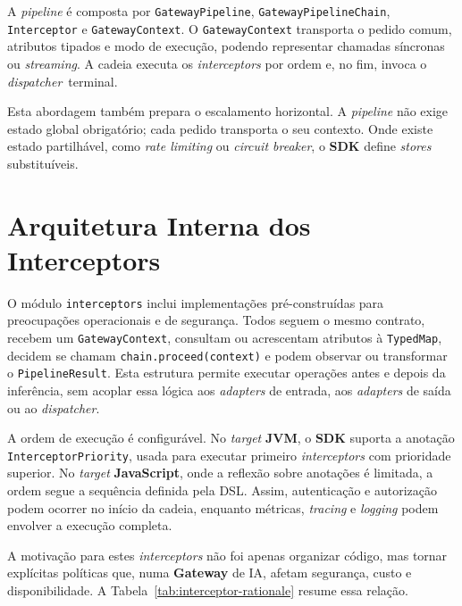     A \textit{pipeline} é composta por \texttt{GatewayPipeline}, \texttt{Gateway\-Pipeline\-Chain}, \texttt{Interceptor} e \texttt{Gateway\allowbreak Context}. O \texttt{GatewayContext} transporta o pedido comum, atributos tipados e modo de execução, podendo representar chamadas síncronas ou \textit{streaming}. A cadeia executa os \textit{interceptors} por ordem e, no fim, invoca o \textit{dispatcher}\allowbreak~terminal.

    Esta abordagem também prepara o escalamento horizontal. A \textit{pipeline} não exige estado global obrigatório; cada pedido transporta o seu contexto. Onde existe estado partilhável, como \textit{rate limiting} ou \textit{circuit breaker}, o \textbf{SDK} define \textit{stores} substituíveis. 

    \section{Arquitetura Interna dos Interceptors}
    O módulo \texttt{interceptors} inclui implementações pré-construídas para preocupações operacionais e de segurança. Todos seguem o mesmo contrato, recebem um \texttt{GatewayContext}, consultam ou acrescentam atributos à \texttt{TypedMap}, decidem se chamam \texttt{chain.proceed(context)} e podem observar ou transformar o \texttt{PipelineResult}. 
    Esta estrutura permite executar operações antes e depois da inferência, sem acoplar essa lógica aos \textit{adapters} de entrada, aos \textit{adapters} de saída ou ao \textit{dispatcher}.

    A ordem de execução é configurável. No \textit{target} \textbf{JVM}, o \textbf{SDK} suporta a anotação \texttt{Interceptor\allowbreak Priority}, usada para executar primeiro \textit{interceptors} com prioridade superior. No \textit{target} \textbf{JavaScript}, onde a reflexão sobre anotações é limitada, a ordem segue a sequência definida pela DSL. Assim, autenticação e autorização podem ocorrer no início da cadeia, enquanto métricas, \textit{tracing} e \textit{logging} podem envolver a execução completa.

    A motivação para estes \textit{interceptors} não foi apenas organizar código, mas tornar explícitas políticas que, numa \textbf{Gateway} de IA, afetam segurança, custo e disponibilidade. A Tabela~\ref{tab:interceptor-rationale} resume essa relação.


